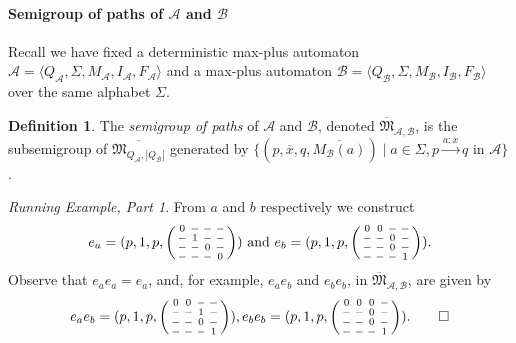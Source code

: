\documentclass[10pt,a4paper]{amsart}
\theoremstyle{definition}
\newtheorem{defi}[defi]{Definition}
\numberwithin{equation}{section}
\theoremstyle{remark}
\newcommand{\ideal}{\mathfrak{M}}
\newcommand{\autA}{\mathcal{A}}
\newcommand{\autB}{\mathcal{B}}
\newcommand{\nopath}{-}
\newenvironment{smallpmatrix}
  {\left(\begin{smallmatrix}}
  {\end{smallmatrix}\right)}
\theoremstyle{remark}
\newtheorem{runningexample/}{Running Example, Part}
\newenvironment{runningexample}
  {\renewcommand{\qedsymbol}{\color{darkgray}\ensuremath{\lrcorner}}%
   \pushQED{\qed}\begin{runningexample/}}
  {\popQED\end{runningexample/}}
\begin{document}
\paragraph*{Semigroup of paths of $\autA$ and $\autB$}

Recall we have fixed a deterministic max-plus automaton $\autA = \langle Q_\autA, \Sigma, M_\autA, I_\autA, F_\autA\rangle$ and a max-plus automaton $\autB = \langle Q_\autB, \Sigma, M_\autB, I_\autB, F_\autB\rangle$ over the same alphabet $\Sigma$.

\begin{defi}\label{def:sgofp}
The \emph{semigroup of paths} of $\autA$ and $\autB$, denoted $\overline{\ideal}_{\autA,\autB}$, is the subsemigroup of $\overline{\ideal_{Q_\autA,|Q_\autB|}}$ generated by $\{(p,\overline{x},q,\overline{M_\autB(a)}) \mid a\in \Sigma, p\xrightarrow{a:x}q \text{ in } \autA\}$.
\end{defi}

\begin{runningexample}
From $a$ and $b$ respectively we construct
\[e_a = (p,1,p,
\begin{smallpmatrix}
0 & \nopath & \nopath & \nopath\\
\nopath & 1 & \nopath & \nopath\\
\nopath & \nopath & 0 & \nopath\\
\nopath & \nopath & \nopath & 0
\end{smallpmatrix}) \text{ and } e_b = (p,1,p,
\begin{smallpmatrix}
0 & 0 & \nopath & \nopath\\
\nopath & \nopath & 0 & \nopath\\
\nopath & \nopath & 0 & \nopath\\
\nopath & \nopath & \nopath & 1
\end{smallpmatrix}).\] 
Observe that $e_ae_a = e_a $, and, for example, $e_ae_b$ and $e_be_b$, in $\overline{\ideal}_{\autA,\autB}$, are given by  \[e_ae_b= (p,1,p,
\begin{smallpmatrix}
0 & 0 & \nopath & \nopath\\
\nopath & \nopath & 1 & \nopath\\
\nopath & \nopath & 0 & \nopath\\
\nopath & \nopath & \nopath & 1
\end{smallpmatrix}),  e_be_b=  (p,1,p,
\begin{smallpmatrix}
0 & 0 & 0 & \nopath\\
\nopath & \nopath & 0 & \nopath\\
\nopath & \nopath & 0 & \nopath\\
\nopath & \nopath & \nopath & 1
\end{smallpmatrix}).
\qedhere\] 
\end{runningexample}
\end{document}
